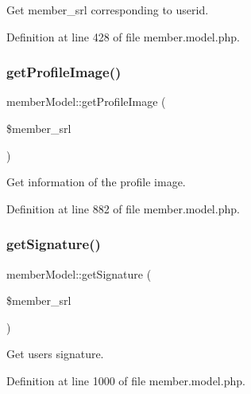 Get member\+\_\+srl corresponding to userid. 



Definition at line 428 of file member.\+model.\+php.

\hypertarget{classmemberModel_af5bd1dffc3b3a613ecbb549ef1c980ac}{}\label{classmemberModel_af5bd1dffc3b3a613ecbb549ef1c980ac} 
\subsubsection{\texorpdfstring{get\+Profile\+Image()}{getProfileImage()}}
{\footnotesize\ttfamily member\+Model\+::get\+Profile\+Image (\begin{DoxyParamCaption}\item[{}]{\$member\+\_\+srl }\end{DoxyParamCaption})}



Get information of the profile image. 



Definition at line 882 of file member.\+model.\+php.

\hypertarget{classmemberModel_a188af39a0460de37242d2df2651dc6e5}{}\label{classmemberModel_a188af39a0460de37242d2df2651dc6e5} 
\subsubsection{\texorpdfstring{get\+Signature()}{getSignature()}}
{\footnotesize\ttfamily member\+Model\+::get\+Signature (\begin{DoxyParamCaption}\item[{}]{\$member\+\_\+srl }\end{DoxyParamCaption})}



Get user\textquotesingle{}s signature. 



Definition at line 1000 of file member.\+model.\+php.

\hypertarget{classmemberModel_ab249b6e54c0b7d472d3cd50ad3b658dc}{}\label{classmemberModel_ab249b6e54c0b7d472d3cd50ad3b658dc} 
